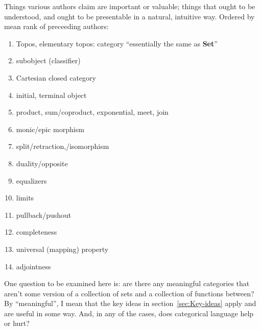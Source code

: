 \documentclass[11pt,openany]{book}
\begin{document}
Things various authors claim are important or valuable;
things that ought to be understood,
and ought to be presentable in a natural, intuitive way.
Ordered by mean rank of preceeding authors:
\begin{enumerate}
  \item Topos, elementary topos: 
  category ``essentially the same as \textbf{Set}''
  \item subobject (classifier)
  \item Cartesian closed category
  \item initial, terminal object
  \item product, sum/coproduct, exponential, meet, join
  \item monic/epic morphism
  \item split/retraction,/isomorphism
  \item duality/opposite
  \item equalizers
  \item limits
  \item pullback/pushout
  \item completeness
  \item universal (mapping) property
  \item adjointness
\end{enumerate}

\setcounter{currentlevel}{\value{baseSectionLevel}}
\label{sec:Example-categories}

One question to be examined here is: are there any meaningful
categories that aren't some version of a collection of sets
and a collection of functions between? 
By ``meaningful'', I mean that the key ideas 
in section~\ref{sec:Key-ideas} apply
and are useful in some way.
And, in any of the cases, 
does categorical language help or hurt?
\end{document}
